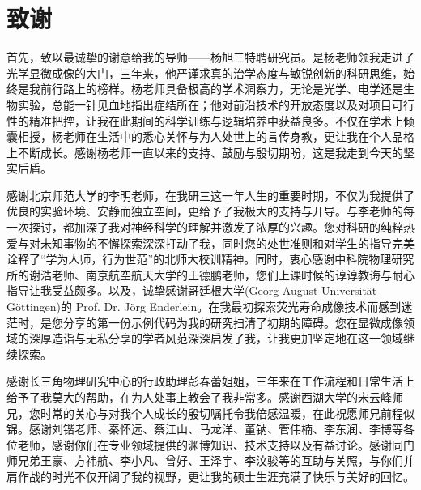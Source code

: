 \chapter[致谢]{致\quad 谢}%

首先，致以最诚挚的谢意给我的导师——杨旭三特聘研究员。是杨老师领我走进了光学显微成像的大门，三年来，他严谨求真的治学态度与敏锐创新的科研思维，始终是我前行路上的榜样。杨老师具备极高的学术洞察力，无论是光学、电学还是生物实验，总能一针见血地指出症结所在；他对前沿技术的开放态度以及对项目可行性的精准把控，让我在此期间的科学训练与逻辑培养中获益良多。不仅在学术上倾囊相授，杨老师在生活中的悉心关怀与为人处世上的言传身教，更让我在个人品格上不断成长。感谢杨老师一直以来的支持、鼓励与殷切期盼，这是我走到今天的坚实后盾。

感谢北京师范大学的李明老师，在我研三这一年人生的重要时期，不仅为我提供了优良的实验环境、安静而独立空间，更给予了我极大的支持与开导。与李老师的每一次探讨，都加深了我对神经科学的理解并激发了浓厚的兴趣。您对科研的纯粹热爱与对未知事物的不懈探索深深打动了我，同时您的处世准则和对学生的指导完美诠释了``学为人师，行为世范''的北师大校训精神。同时，衷心感谢中科院物理研究所的谢浩老师、南京航空航天大学的王德鹏老师，您们上课时候的谆谆教诲与耐心指导让我受益颇多。以及，诚挚感谢哥廷根大学(Georg-August-Universität Göttingen)的 Prof. Dr. Jörg Enderlein。在我最初探索荧光寿命成像技术而感到迷茫时，是您分享的第一份示例代码为我的研究扫清了初期的障碍。您在显微成像领域的深厚造诣与无私分享的学者风范深深启发了我，让我更加坚定地在这一领域继续探索。

感谢长三角物理研究中心的行政助理彭春蕾姐姐，三年来在工作流程和日常生活上给予了我莫大的帮助，在为人处事上教会了我非常多。感谢西湖大学的宋云峰师兄，您时常的关心与对我个人成长的殷切嘱托令我倍感温暖，在此祝愿师兄前程似锦。感谢刘锴老师、秦怀远、蔡江山、马龙洋、董钠、管伟楠、李东润、李博等各位老师，感谢你们在专业领域提供的渊博知识、技术支持以及有益讨论。感谢同门师兄弟王豪、方祎航、李小凡、曾好、王泽宇、李汶骏等的互助与关照，与你们并肩作战的时光不仅开阔了我的视野，更让我的硕士生涯充满了快乐与美好的回忆。

